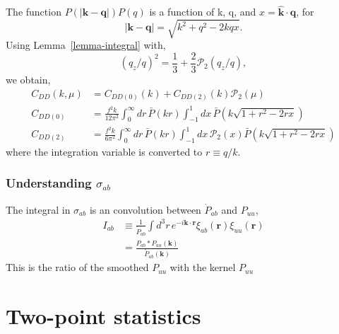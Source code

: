 \documentclass[a4paper,11pt, fleqn]{article}
\begin{document}
The function $P(|\bm{k} - \bm{q}|)P(q)$ is a function of k, q, and $x
= \bm{\hat{k}}\cdot\bm{q}$, for
\begin{equation}
  |\bm{k} - \bm{q}| = \sqrt{k^2 + q^2 - 2kqx}.
\end{equation}
Using Lemma~\ref{lemma-integral} with,
\begin{equation}
  (q_z/q)^2 = \frac{1}{3} + \frac{2}{3} \mathcal{P}_2(q_z/q),
\end{equation}
we obtain,
\begin{align}
  C_{DD}(k, \mu) &= C_{DD(0)}(k) +
                   C_{DD(2)}(k) \mathcal{P}_2(\mu)\\
  C_{DD(0)} &= \frac{f^2 k}{12\pi^2}
                \int_0^\infty \! dr \, \bar{P}(kr)
                \int_{-1}^1 \! dx \, 
                \bar{P}\left(k\sqrt{1 + r^2 - 2rx}\right)\\
  C_{DD(2)} &= \frac{f^2 k}{6\pi^2}
                \int_0^\infty \! dr \, \bar{P}(kr)
                \int_{-1}^1 \! dx \, \mathcal{P}_2(x)
                \bar{P}\left(k\sqrt{1 + r^2 - 2rx}\right)
\end{align}
where the integration variable is converted to $r \equiv q/k$.


\clearpage
\subsubsection{Understanding $\sigma_{ab}$}

The integral in $\sigma_{ab}$ is an convolution between $\mathring{P}_{ab}$ and
$P_{uu}$,
%
\begin{align}
  I_{ab} &\equiv \frac{1}{\mathring{P}_{ab}}
  \int \! d^3 r \, e^{-i\bm{k}\cdot\bm{r}}
  \xi_{ab}(\bm{r}) \xi_{uu}(\bm{r})\\
  &= \frac{P_{ab} * P_{uu}(\bm{k})}{\mathring{P}_{ab}(\bm{k})}
\end{align}
%
This is the ratio of the smoothed $P_{uu}$ with the kernel $P_{uu}$


%
%
\sectionfont{\sffamily\Huge\color{Blue}\selectfont}
\subsectionfont{\sffamily\color{Blue}\selectfont}
\subsubsectionfont{\sffamily\color{Blue}\selectfont}
\paragraphfont{\sffamily\color{Blue}\selectfont}

%
%

\clearpage
\section{Two-point statistics}
\end{document}
